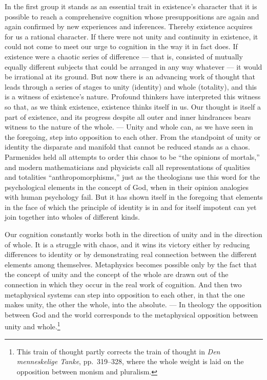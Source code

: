 \documentclass[12pt]{book}
\newcommand{\opage}[1]{\marginnote{\footnotesize\textit{[#1]}}}
\begin{document}
In the first group it stands as an essential trait in existence's character that it is possible to reach a
comprehensive cognition whose presuppositions are again and again confirmed by new experiences and inferences.
Thereby existence acquires for us a rational character. If there were not unity and continuity in existence, it
could not come to meet our urge to cognition in the way it in fact does. If existence were a chaotic series of
difference --- that is, consisted of mutually equally different subjects that could be arranged in any way
whatever --- it would be irrational at its ground. But now there is an advancing work of thought that leads
through a series of stages to unity (identity) and whole (totality), and this is a witness of existence's
nature. Profound thinkers have interpreted \opage{89}this witness so that, as we think existence, existence thinks itself
in us. Our thought is itself a part of existence, and its progress despite all outer and inner hindrances bears
witness to the nature of the whole. --- Unity and whole can, as we have seen in the foregoing, step into
opposition to each other. From the standpoint of unity or identity the disparate and manifold that cannot be
reduced stands as a chaos. Parmenides held all attempts to order this chaos to be ``the opinions of mortals,''
and modern mathematicians and physicists call all representations of qualities and totalities
``anthropomorphisms,'' just as the theologians use this word for the psychological elements in the concept of
God, when in their opinion analogies with human psychology fail. But it has shown itself in the foregoing that
elements in the face of which the principle of identity is in and for itself impotent can yet join together
into wholes of different kinds.

Our cognition constantly works both in the direction of unity and in the direction of whole. It is a struggle
with chaos, and it wins its victory either by reducing differences to identity or by demonstrating real
connection between the different elements among themselves. Metaphysics becomes possible only by the fact that
the concept of unity and the concept of the whole are drawn out of the connection in which they occur in the
real work of cognition. And then two metaphysical systems can step into opposition to each other, in that the
one makes unity, the other the whole, into the absolute. --- In theology the opposition between God and the
world corresponds to the metaphysical opposition between unity and whole.\footnote{This train of thought partly
corrects the train of thought in \textit{Den menneskelige Tanke}, pp.\ 319--328, where the whole weight is
laid on the opposition between monism and pluralism.}
\end{document}
